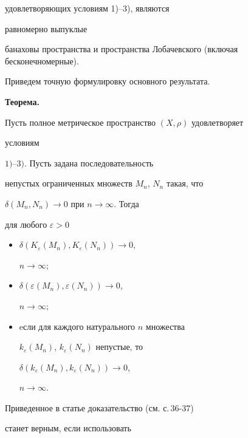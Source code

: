 удовлетворяющих условиям 1)--3), являются 


равномерно выпуклые 


банаховы пространства и пространства Лобачевского (включая бесконечномерные).





Приведем точную формулировку основного результата.


\medskip





{\bf Теорема.} {\it


Пусть полное метрическое пространство $(X,\rho)$ удовлетворяет


условиям \linebreak


$1)$--$3)$. Пусть задана последовательность


непустых ограниченных множеств $M_{n}$, $N_{n}$ такая, что


$\delta (M_{n},N_{n}) \rightarrow 0$ при $n \rightarrow \infty $. Тогда


для любого $\varepsilon>0$


\begin{itemize}


\item[A.] $\delta (K_{\varepsilon }(M_{n}),K_{\varepsilon }(N_{n})) \rightarrow 0$,


$n \rightarrow \infty ;$


\item[B.] $\delta (\varepsilon (M_{n}),\varepsilon (N_{n})) \rightarrow 0$,


$n \rightarrow \infty ;$


\item[C.] eсли для каждого натурального $n$ множества 


$k_{\varepsilon }(M_{n})$, $k_{\varepsilon }(N_{n})$ непустые, то\linebreak 


$\delta (k_{\varepsilon }(M_{n}),k_{\varepsilon }(N_{n})) \rightarrow 0$,


$n \rightarrow \infty $.


\end{itemize}


}





Приведенное в статье доказательство (см. с.\,36-37)


станет верным, если использовать


